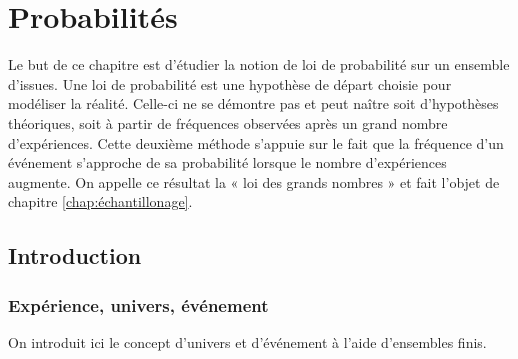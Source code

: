 \chapter{Probabilités}


Le but de ce chapitre est d'étudier la notion de loi de probabilité sur un ensemble d'issues.
Une loi de probabilité est une hypothèse de départ choisie pour modéliser la réalité.
Celle-ci ne se démontre pas et peut naître soit d'hypothèses théoriques, soit à partir de fréquences observées après un grand nombre d'expériences.
Cette deuxième méthode s'appuie sur le fait que la fréquence d'un événement s'approche de sa probabilité lorsque le nombre d'expériences augmente.
On appelle ce résultat la « loi des grands nombres » et fait l'objet de chapitre \ref{chap:échantillonage}.

\section{Introduction}

\subsection{Expérience, univers, événement}


On introduit ici le concept d'univers et d'événement à l'aide d'ensembles finis.



